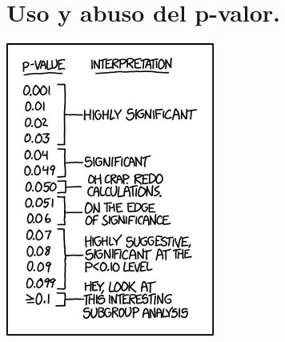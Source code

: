 \documentclass[
  9pt,
  ignorenonframetext,
]{beamer}
\begin{document}
\hypertarget{uso-y-abuso-del-p-valor.}{%
\section{Uso y abuso del p-valor.}\label{uso-y-abuso-del-p-valor.}}

\begin{frame}

\begin{center}\includegraphics[width=0.5\linewidth]{../fig/xkcd_p_values_2x} \end{center}

\end{frame}
\end{document}
